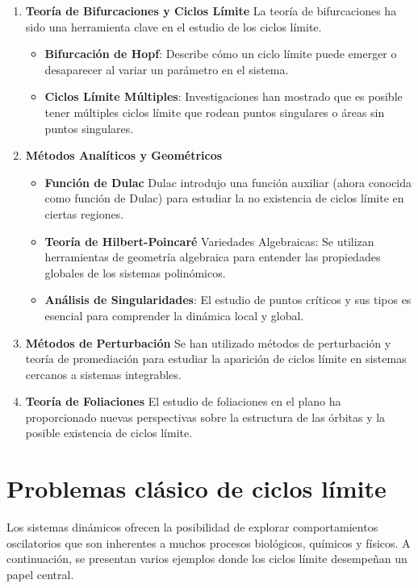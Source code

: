 \documentclass[12pt, a4paper]{report}
\begin{document}
\begin{enumerate}
	\item \textbf{Teoría de Bifurcaciones y Ciclos Límite}
	La teoría de bifurcaciones ha sido una herramienta clave en el estudio de los ciclos límite.
	\begin{itemize}
		\item \textbf{Bifurcación de Hopf}: Describe cómo un ciclo límite puede emerger o desaparecer al variar un parámetro en el sistema.
		\item \textbf{Ciclos Límite Múltiples}: Investigaciones han mostrado que es posible tener múltiples ciclos límite que rodean puntos singulares o áreas sin puntos singulares.
	\end{itemize}
	\item \textbf{Métodos Analíticos y Geométricos}
	\begin{itemize}
		\item 	\textbf{Función de Dulac}
		Dulac introdujo una función auxiliar (ahora conocida como función de Dulac) para estudiar la no existencia de ciclos límite en ciertas regiones.
		\item \textbf{Teoría de Hilbert-Poincaré}
		Variedades Algebraicas: Se utilizan herramientas de geometría algebraica para entender las propiedades globales de los sistemas polinómicos.
		
		\item \textbf{Análisis de Singularidades}: El estudio de puntos críticos y sus tipos es esencial para comprender la dinámica local y global.
	\end{itemize}

	\item \textbf{Métodos de Perturbación}
	Se han utilizado métodos de perturbación y teoría de promediación para estudiar la aparición de ciclos límite en sistemas cercanos a sistemas integrables.
	\item \textbf{Teoría de Foliaciones}
	El estudio de foliaciones en el plano ha proporcionado nuevas perspectivas sobre la estructura de las órbitas y la posible existencia de ciclos límite.

\end{enumerate}

\section{Problemas clásico de ciclos límite}

Los sistemas dinámicos ofrecen la posibilidad de explorar comportamientos oscilatorios que son inherentes a muchos procesos biológicos, químicos y físicos. A continuación, se presentan varios ejemplos donde los ciclos límite desempeñan un papel central.
\end{document}
